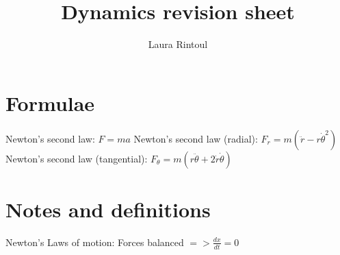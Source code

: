 \documentclass{article}
\title{Dynamics revision sheet}
\author{Laura Rintoul}
\date{}
\begin{document}
\maketitle


\section{Formulae}
\begin{multicols}{2}
Newton's second law: $F = ma$
\newline
Newton's second law (radial): $ F_r = m(\ddot{r} -r \dot{\theta}^2)$
\newline
Newton's second law (tangential): $F_{\theta} = m(r\ddot{\theta}+2\dot{r}\dot{\theta})$
\newline

\end{multicols}


\section{Notes and definitions}
Newton's Laws of motion:
\newline
Forces balanced $=>\frac{dx}{dt} = 0$
\end{document}
